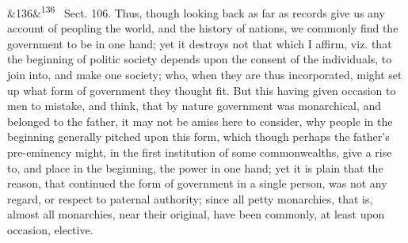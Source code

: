 \documentclass[12pt]{article}
\newcommand{\para}[1][]{\par\noindent\ifx&#1&\else\textsuperscript{\footnotesize #1}~\fi}
\begin{document}
\para[136] Sect. 106. Thus, though looking back as far as records give us any account of peopling the world, and the history of nations, we commonly find the government to be in one hand; yet it destroys not that which I affirm, viz. that the beginning of politic society depends upon the consent of the individuals, to join into, and make one society; who, when they are thus incorporated, might set up what form of government they thought fit. But this having given occasion to men to mistake, and think, that by nature government was monarchical, and belonged to the father, it may not be amiss here to consider, why people in the beginning generally pitched upon this form, which though perhaps the father's pre-eminency might, in the first institution of some commonwealths, give a rise to, and place in the beginning, the power in one hand; yet it is plain that the reason, that continued the form of government in a single person, was not any regard, or respect to paternal authority; since all petty monarchies, that is, almost all monarchies, near their original, have been commonly, at least upon occasion, elective.
\end{document}
